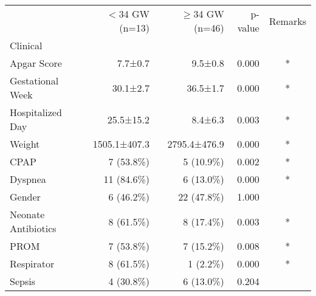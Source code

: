 \begin{tabular}{lrrrc}
\toprule
{} & $<$34 GW (n=13) & $\ge$34 GW (n=46) & p-value & Remarks \\
Clinical            &               &               &         &         \\
\midrule
Apgar Score         &       7.7±0.7 &       9.5±0.8 &   0.000 &       * \\
Gestational Week    &      30.1±2.7 &      36.5±1.7 &   0.000 &       * \\
Hospitalized Day    &     25.5±15.2 &       8.4±6.3 &   0.003 &       * \\
Weight              &  1505.1±407.3 &  2795.4±476.9 &   0.000 &       * \\
CPAP                &     7 (53.8\%) &     5 (10.9\%) &   0.002 &       * \\
Dyspnea             &    11 (84.6\%) &     6 (13.0\%) &   0.000 &       * \\
Gender              &     6 (46.2\%) &    22 (47.8\%) &   1.000 &         \\
Neonate Antibiotics &     8 (61.5\%) &     8 (17.4\%) &   0.003 &       * \\
PROM                &     7 (53.8\%) &     7 (15.2\%) &   0.008 &       * \\
Respirator          &     8 (61.5\%) &      1 (2.2\%) &   0.000 &       * \\
Sepsis              &     4 (30.8\%) &     6 (13.0\%) &   0.204 &         \\
\bottomrule
\end{tabular}
